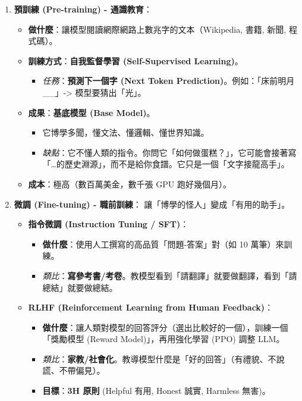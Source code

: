 \documentclass[
  letterpaper,
  DIV=11,
  numbers=noendperiod]{scrreprt}
\providecommand{\tightlist}{%
  \setlength{\itemsep}{0pt}\setlength{\parskip}{0pt}}
\begin{document}
\begin{enumerate}
\def\labelenumi{\arabic{enumi}.}
\tightlist
\item
  \textbf{預訓練 (Pre-training) - 通識教育}：

  \begin{itemize}
  \tightlist
  \item
    \textbf{做什麼}：讓模型閱讀網際網路上數兆字的文本（Wikipedia, 書籍,
    新聞, 程式碼）。
  \item
    \textbf{訓練方式}：\textbf{自我監督學習 (Self-Supervised
    Learning)}。

    \begin{itemize}
    \tightlist
    \item
      \emph{任務}：\textbf{預測下一個字 (Next Token
      Prediction)}。例如：「床前明月\_\_」-\textgreater{}
      模型要猜出「光」。
    \end{itemize}
  \item
    \textbf{成果}：\textbf{基底模型 (Base Model)}。

    \begin{itemize}
    \tightlist
    \item
      它博學多聞，懂文法、懂邏輯、懂世界知識。
    \item
      \emph{缺點}：它不懂人類的指令。你問它「如何做蛋糕？」，它可能會接著寫「\ldots 的歷史淵源」，而不是給你食譜。它只是一個「文字接龍高手」。
    \end{itemize}
  \item
    \textbf{成本}：極高（數百萬美金，數千張 GPU 跑好幾個月）。
  \end{itemize}
\item
  \textbf{微調 (Fine-tuning) - 職前訓練}：
  讓「博學的怪人」變成「有用的助手」。

  \begin{itemize}
  \tightlist
  \item
    \textbf{指令微調 (Instruction Tuning / SFT)}：

    \begin{itemize}
    \tightlist
    \item
      \textbf{做什麼}：使用人工撰寫的高品質「問題-答案」對（如 10
      萬筆）來訓練。
    \item
      \emph{類比}：\textbf{寫參考書/考卷}。教模型看到「請翻譯」就要做翻譯，看到「請總結」就要做總結。
    \end{itemize}
  \item
    \textbf{RLHF (Reinforcement Learning from Human Feedback)}：

    \begin{itemize}
    \tightlist
    \item
      \textbf{做什麼}：讓人類對模型的回答評分（選出比較好的一個），訓練一個「獎勵模型
      (Reward Model)」，再用強化學習 (PPO) 調整 LLM。
    \item
      \emph{類比}：\textbf{家教/社會化}。教導模型什麼是「好的回答」（有禮貌、不說謊、不帶偏見）。
    \item
      \textbf{目標}：\textbf{3H 原則} (Helpful 有用, Honest 誠實,
      Harmless 無害)。
    \end{itemize}
  \end{itemize}
\end{enumerate}
\end{document}

